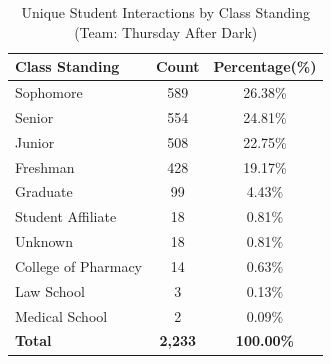 \documentclass[
  letterpaper,
  DIV=11,
  numbers=noendperiod]{scrartcl}
\begin{document}
\begingroup\fontsize{10}{12}\selectfont

\begin{longtable}[t]{lcc}
\caption{\label{tab:ClssStnd_TAD}Unique Student Interactions by Class Standing (Team: Thursday After Dark)}\\
\toprule
\textbf{Class Standing} & \textbf{Count} & \textbf{Percentage(\%)}\\
\midrule
Sophomore & 589 & 26.38\%\\
Senior & 554 & 24.81\%\\
Junior & 508 & 22.75\%\\
Freshman & 428 & 19.17\%\\
Graduate & 99 & 4.43\%\\
Student Affiliate & 18 & 0.81\%\\
Unknown & 18 & 0.81\%\\
College of Pharmacy & 14 & 0.63\%\\
Law School & 3 & 0.13\%\\
Medical School & 2 & 0.09\%\\
\midrule
\textbf{Total} & \textbf{2,233} & \textbf{100.00\%}\\
\bottomrule
\end{longtable}
\endgroup{}

\begin{table}[!h]
\centering
\caption{\label{tab:ChrtTblTAD}Unique Student Interactions by Cohort}
\centering
{}
\end{table}
\end{document}
